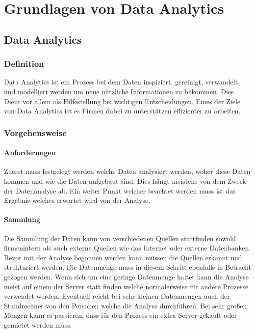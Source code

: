 \chapter{Grundlagen von Data Analytics}
\bauer
	
	\section{Data Analytics}
	
		\subsection{Definition}
			Data Analytics ist ein Prozess bei dem Daten inspiziert, gereinigt, verwandelt und modelliert werden um neue nützliche Informationen zu bekommen. Dies Dient vor allem als Hilfestellung bei wichtigen Entscheidungen. Eines der Ziele von Data Analytics ist es Firmen dabei zu unterstützen effizienter zu arbeiten. 
	
		\subsection{Vorgehensweise}
		
			\subsubsection{Anforderungen}
				Zuerst muss festgelegt werden welche Daten analysiert werden, woher diese Daten kommen und wie die Daten aufgebaut sind. Dies hängt meistens von dem Zweck der Datenanalyse ab. Ein weiter Punkt welcher beachtet werden muss ist das Ergebnis welches erwartet wird von der Analyse.
			
			\subsubsection{Sammlung}
				Die Sammlung der Daten kann von verschiedenen Quellen stattfinden sowohl firmenintern als auch externe Quellen wie das Internet oder externe Datenbanken. Bevor mit der Analyse begonnen werden kann müssen die Quellen erkannt und strukturiert werden. Die Datenmenge muss in diesem Schritt ebenfalls in Betracht gezogen werden. Wenn sich um eine geringe Datenmenge haltet kann die Analyse meist auf einem der Server statt finden welche normalerweise für andere Prozesse verwendet werden. Eventuell reicht bei sehr kleinen Datenmengen auch der Standrechner von den Personen welche die Analyse durchführen. Bei sehr großen Mengen kann es passieren, dass für den Prozess ein extra Server gekauft oder gemietet werden muss. 
			
